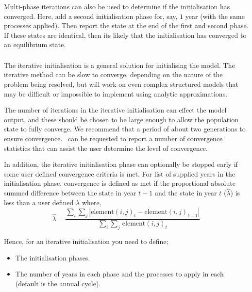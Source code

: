 Multi-phase iterations can also be used to determine if the initialisation has converged. Here, add a second initialisation phase for, say, $1$ year (with the same processes applied). Then report the state at the end of the first and second phase. If these states are identical, then its likely that the initialisation has converged to an equilibrium state.

\subsubsection*{}

The iterative initialisation is a general solution for initialising the model. The iterative method can be slow to converge, depending on the nature of the problem being resolved, but will work on even complex structured models that may be difficult or impossible to implement using analytic approximations. 

The number of iterations in the iterative initialisation can effect the model output, and these should be chosen to be large enough to allow the population state to fully converge. We recommend that a period of about two generations to ensure convergence. \CNAME\ can be requested to report a number of convergence statistics that can assist the user determine the level of convergence.

In addition, the iterative initialisation phase can optionally be stopped early if some user defined convergence criteria is met. For list of supplied years in the initialisation phase, convergence is defined as met if the proportional absolute summed difference between the state in year $t-1$ and the state in year $t$ ($\widehat{\lambda}$) is less than a user defined $\lambda$ where, 
\begin{equation}
  \widehat{\lambda} = \frac{\sum\limits_{i} \sum\limits_{j} \left|\text{element}(i,j)_t - \text{element}(i,j)_{t-1} \right|}{\sum\limits_{i} \sum\limits_{j} \frac{}{}\text{element}(i,j)_t}
\end{equation}

Hence, for an iterative initialisation you need to define;
\begin{itemize}
  \item The initialisation phases.
  \item The number of years in each phase and the processes to apply in each (default is the annual cycle).
\end{itemize}

